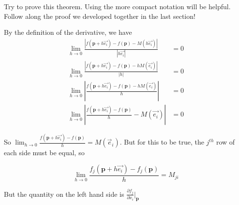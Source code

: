 \documentclass{ximera}
\begin{document}
	Try to prove this theorem.  Using the more compact notation will be helpful.  Follow along the proof we developed together in the last section!
	\begin{free-response}
		By the definition of the derivative,  we have 
		\begin{align*}
		 \lim_{h \to 0} \frac{\left| f(\mathbf{p}+h\vec{e_i}) - f(\mathbf{p}) - M(h\vec{e_i}) \right|}{\left| h\vec{e_i}\right|} &= 0\\
		 \lim_{h \to 0} \frac{\left| f(\mathbf{p}+h\vec{e_i}) - f(\mathbf{p}) - hM(\vec{e_i}) \right|}{|h|} &= 0\\
		 \lim_{h \to 0} \left| \frac{f(\mathbf{p}+h\vec{e_i}) - f(\mathbf{p}) - hM(\vec{e_i})}{h} \right|&= 0\\
		  \lim_{h \to 0} \left| \frac{f(\mathbf{p}+h\vec{e_i}) - f(\mathbf{p})}{h} - M(\vec{e_i}) \right|&= 0
		 \end{align*}
		 
		 So $\lim_{h \to 0}  \frac{f(\mathbf{p}+h\vec{e_i}) - f(\mathbf{p})}{h}  = M (\vec{e}_i)$.  But for this to be true, the $j^{th}$ row of each side must be equal, so 
		 
		\[\lim_{h \to 0}  \frac{f_j(\mathbf{p}+h\vec{e_i}) - f_j(\mathbf{p})}{h}  = M _{ji}\]
		
		But the quantity on the left hand side is $\frac{\partial f_j}{\partial x_i}\big|_{\mathbf{p}}$
	\end{free-response}
	
\end{document}
